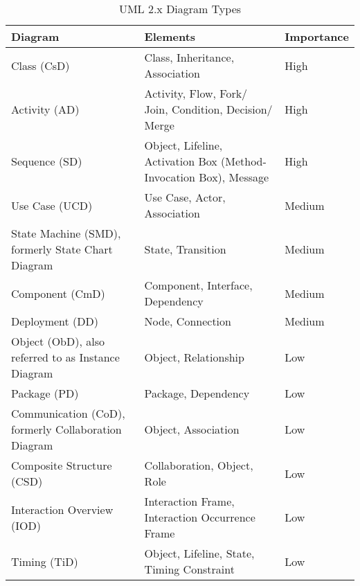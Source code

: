 \begin{table}[ht]
    \begin{center}
        \begin{footnotesize}
        \begin{tabular}{| p{35mm} | p{55mm} | p{15mm} |}
            \hline
            \textbf{Diagram} & \textbf{Elements} & \textbf{Importance}\\
            \hline
            Class (CsD) & Class, Inheritance, Association & High\\
            \hline
            Activity (AD) & Activity, Flow, Fork/ Join, Condition, Decision/ Merge & High\\
            \hline
            Sequence (SD) & Object, Lifeline, Activation Box (Method-Invocation Box), Message & High\\
            \hline
            Use Case (UCD) & Use Case, Actor, Association & Medium\\
            \hline
            State Machine (SMD), formerly State Chart Diagram & State, Transition & Medium\\
            \hline
            Component (CmD) & Component, Interface, Dependency & Medium\\
            \hline
            Deployment (DD) & Node, Connection & Medium\\
            \hline
            Object (ObD), also referred to as Instance Diagram & Object, Relationship & Low\\
            \hline
            Package (PD) & Package, Dependency & Low\\
            \hline
            Communication (CoD), formerly Collaboration Diagram & Object, Association & Low\\
            \hline
            Composite Structure (CSD) & Collaboration, Object, Role & Low\\
            \hline
            Interaction Overview (IOD) & Interaction Frame, Interaction Occurrence Frame & Low\\
            \hline
            Timing (TiD) & Object, Lifeline, State, Timing Constraint & Low\\
            \hline
        \end{tabular}
        \end{footnotesize}
        \caption{UML 2.x Diagram Types \cite{ambler2005}}
        \label{diagrams_table}
    \end{center}
\end{table}

